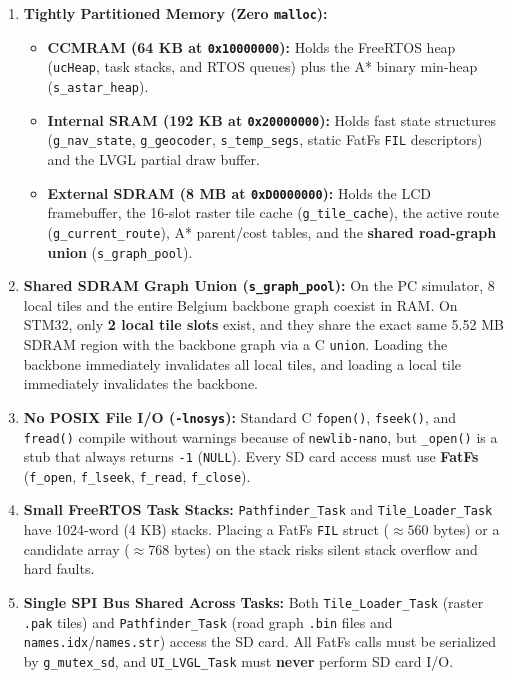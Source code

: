 \documentclass[11pt,a4paper]{article}
\begin{document}
\begin{enumerate}
    \item \textbf{Tightly Partitioned Memory (Zero \texttt{malloc}):}
    \begin{itemize}
        \item \textbf{CCMRAM (64 KB at \texttt{0x10000000}):} Holds the FreeRTOS heap (\texttt{ucHeap}, task stacks, and RTOS queues) plus the A* binary min-heap (\texttt{s\_astar\_heap}).
        \item \textbf{Internal SRAM (192 KB at \texttt{0x20000000}):} Holds fast state structures (\texttt{g\_nav\_state}, \texttt{g\_geocoder}, \texttt{s\_temp\_segs}, static FatFs \texttt{FIL} descriptors) and the LVGL partial draw buffer.
        \item \textbf{External SDRAM (8 MB at \texttt{0xD0000000}):} Holds the LCD framebuffer, the 16-slot raster tile cache (\texttt{g\_tile\_cache}), the active route (\texttt{g\_current\_route}), A* parent/cost tables, and the \textbf{shared road-graph union} (\texttt{s\_graph\_pool}).
    \end{itemize}
    \item \textbf{Shared SDRAM Graph Union (\texttt{s\_graph\_pool}):} On the PC simulator, 8 local tiles and the entire Belgium backbone graph coexist in RAM. On STM32, only \textbf{2 local tile slots} exist, and they share the exact same 5.52 MB SDRAM region with the backbone graph via a C \texttt{union}. Loading the backbone immediately invalidates all local tiles, and loading a local tile immediately invalidates the backbone.
    \item \textbf{No POSIX File I/O (\texttt{-lnosys}):} Standard C \texttt{fopen()}, \texttt{fseek()}, and \texttt{fread()} compile without warnings because of \texttt{newlib-nano}, but \texttt{\_open()} is a stub that always returns \texttt{-1} (\texttt{NULL}). Every SD card access must use \textbf{FatFs} (\texttt{f\_open}, \texttt{f\_lseek}, \texttt{f\_read}, \texttt{f\_close}).
    \item \textbf{Small FreeRTOS Task Stacks:} \texttt{Pathfinder\_Task} and \texttt{Tile\_Loader\_Task} have 1024-word (4 KB) stacks. Placing a FatFs \texttt{FIL} struct ($\approx 560$ bytes) or a candidate array ($\approx 768$ bytes) on the stack risks silent stack overflow and hard faults.
    \item \textbf{Single SPI Bus Shared Across Tasks:} Both \texttt{Tile\_Loader\_Task} (raster \texttt{.pak} tiles) and \texttt{Pathfinder\_Task} (road graph \texttt{.bin} files and \texttt{names.idx}/\texttt{names.str}) access the SD card. All FatFs calls must be serialized by \texttt{g\_mutex\_sd}, and \texttt{UI\_LVGL\_Task} must \textbf{never} perform SD card I/O.
\end{enumerate}
\end{document}
